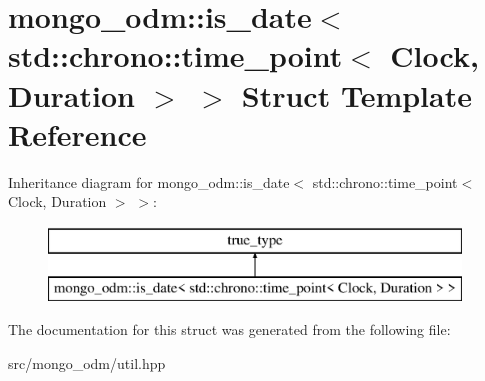 \hypertarget{structmongo__odm_1_1is__date_3_01std_1_1chrono_1_1time__point_3_01Clock_00_01Duration_01_4_01_4}{}\section{mongo\+\_\+odm\+:\+:is\+\_\+date$<$ std\+:\+:chrono\+:\+:time\+\_\+point$<$ Clock, Duration $>$ $>$ Struct Template Reference}
\label{structmongo__odm_1_1is__date_3_01std_1_1chrono_1_1time__point_3_01Clock_00_01Duration_01_4_01_4}
Inheritance diagram for mongo\+\_\+odm\+:\+:is\+\_\+date$<$ std\+:\+:chrono\+:\+:time\+\_\+point$<$ Clock, Duration $>$ $>$\+:\begin{figure}[H]
\begin{center}
\leavevmode
\includegraphics[height=2.000000cm]{structmongo__odm_1_1is__date_3_01std_1_1chrono_1_1time__point_3_01Clock_00_01Duration_01_4_01_4}
\end{center}
\end{figure}


The documentation for this struct was generated from the following file\+:\begin{DoxyCompactItemize}
\item 
src/mongo\+\_\+odm/util.\+hpp\end{DoxyCompactItemize}
